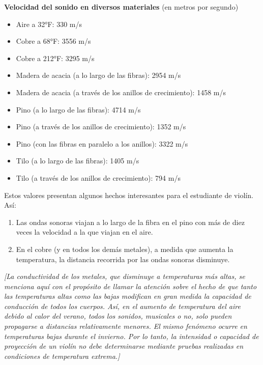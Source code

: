 \documentclass[12pt]{book}
\begin{document}
\begin{center}
\textbf{Velocidad del sonido en diversos materiales} (en metros por segundo)
\end{center}

\begin{itemize}
    \item Aire a 32°F: 330 m/s
    \item Cobre a 68°F: 3556 m/s
    \item Cobre a 212°F: 3295 m/s
    \item Madera de acacia (a lo largo de las fibras): 2954 m/s
    \item Madera de acacia (a través de los anillos de crecimiento): 1458 m/s
    \item Pino (a lo largo de las fibras): 4714 m/s
    \item Pino (a través de los anillos de crecimiento): 1352 m/s
    \item Pino (con las fibras en paralelo a los anillos): 3322 m/s
    \item Tilo (a lo largo de las fibras): 1405 m/s
    \item Tilo (a través de los anillos de crecimiento): 794 m/s
\end{itemize}

Estos valores presentan algunos hechos interesantes para el estudiante de violín. Así:

\begin{enumerate}
    \item Las ondas sonoras viajan a lo largo de la fibra en el pino con más de diez veces la velocidad a la que viajan en el aire.
    \item En el cobre (y en todos los demás metales), a medida que aumenta la temperatura, la distancia recorrida por las ondas sonoras disminuye.
\end{enumerate}

\textit{[La conductividad de los metales, que disminuye a temperaturas más altas, se menciona aquí con el propósito de llamar la atención sobre el hecho de que tanto las temperaturas altas como las bajas modifican en gran medida la capacidad de conducción de todos los cuerpos. Así, en el aumento de temperatura del aire debido al calor del verano, todos los sonidos, musicales o no, solo pueden propagarse a distancias relativamente menores. El mismo fenómeno ocurre en temperaturas bajas durante el invierno. Por lo tanto, la intensidad o capacidad de proyección de un violín no debe determinarse mediante pruebas realizadas en condiciones de temperatura extrema.]}
\end{document}
